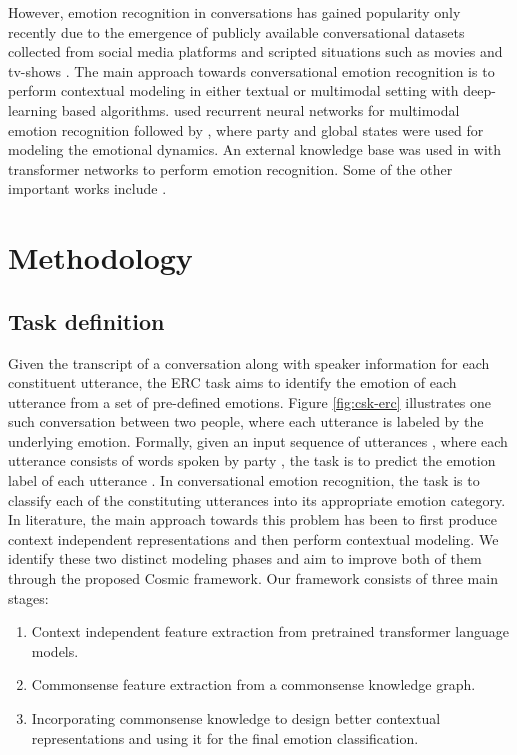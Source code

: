\documentclass[11pt,a4paper]{article}
\begin{document}
However, emotion recognition in conversations has gained popularity only recently due to the emergence of publicly available conversational datasets collected from social media platforms
and scripted situations such as movies and tv-shows \cite{poria2018meld,zahiri2018emotion}.
The main approach towards conversational emotion recognition is to perform contextual modeling in either textual or multimodal setting with deep-learning based algorithms.
\citet{poria-EtAl:2017:Long} used recurrent neural networks for multimodal emotion recognition followed by \cite{dialoguernn}, where party and global states were used for modeling the emotional dynamics. An external knowledge base was used in \cite{zhong2019knowledge} with transformer networks to perform emotion recognition. Some of the other important works include \cite{hazarika2018icon,hazarika-EtAl:2018:N18-1,zadatt,chen2017multimodal,AAAI1817341}. 







\section{Methodology}
\subsection{Task definition}
Given the transcript of a conversation along with speaker information
for each constituent utterance, the ERC task aims to identify the emotion of each utterance from a set of  pre-defined emotions. Figure \ref{fig:csk-erc} illustrates one such
conversation between two people, where each utterance is labeled by the
underlying emotion. Formally, given an input sequence of 
utterances , where each utterance  consists of  words   spoken by
party , the task is to predict the emotion label  of
each utterance .
\label{sec:method}
In conversational emotion recognition, the task is to classify each of the constituting utterances into its appropriate emotion category. In literature, the main approach towards this problem has been to first produce context independent representations and then perform contextual modeling. We identify these two distinct modeling phases and aim to improve both of them through the proposed {\sc Cosmic} framework.
Our framework consists of three main stages:

\begin{enumerate}
    \item Context independent feature extraction from pretrained transformer language models.
    \item Commonsense feature extraction from a commonsense knowledge graph.
    \item Incorporating  commonsense knowledge to design better contextual representations and using it for the final emotion classification.
\end{enumerate}
\end{document}
